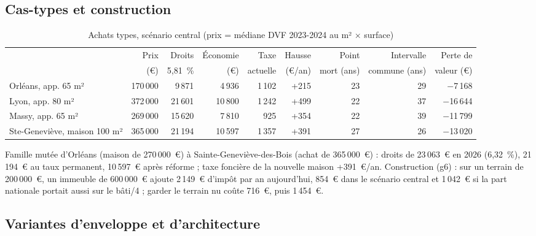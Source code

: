 \subsection{Cas-types et construction}

\begin{table}[!htbp]\centering\scriptsize
\caption{Achats types, scénario central (prix = médiane DVF 2023-2024 au m² × surface)}\label{tab:fon4_cas}
\setlength{\tabcolsep}{3.5pt}
\begin{tabular}{@{}lrrrrrrrr@{}}
\toprule
 & Prix & Droits & Économie & Taxe & Hausse & Point & Intervalle & Perte de \\
 & (€) & 5,81~\% & (€) & actuelle & (€/an) & mort (ans) & commune (ans) & valeur (€) \\
\midrule
Orléans, app. 65 m² & 170\,000 & 9\,871 & 4\,936 & 1\,102 & +215 & 23 & 29 & $-$7\,168 \\
Lyon, app. 80 m² & 372\,000 & 21\,601 & 10\,800 & 1\,242 & +499 & 22 & 37 & $-$16\,644 \\
Massy, app. 65 m² & 269\,000 & 15\,620 & 7\,810 & 925 & +354 & 22 & 39 & $-$11\,799 \\
Ste-Geneviève, maison 100 m² & 365\,000 & 21\,194 & 10\,597 & 1\,357 & +391 & 27 & 26 & $-$13\,020 \\
\bottomrule
\end{tabular}
\par\vspace{2pt}{\raggedright\scriptsize Point mort : économie de droits / hausse annuelle ; un bien revendu plus
souvent y gagne dans le cas (c). Intervalle commune : inverse de la rotation des logements du même type dans la commune.
Perte de valeur : hausse de taxe capitalisée à 3~\%, avant prise en compte des droits.\par}
\end{table}

Famille mutée d'Orléans (maison de 270\,000~€) à Sainte-Geneviève-des-Bois (achat de 365\,000~€) : droits de
23\,063~€ en 2026 (6,32~\%), 21\,194~€ au taux permanent, 10\,597~€ après
réforme ; taxe foncière de la nouvelle maison +391~€/an. Construction (g6) : sur un terrain de
200\,000~€, un immeuble de 600\,000~€ ajoute 2\,149~€ d'impôt par an aujourd'hui,
854~€ dans le scénario central et 1\,042~€ si la part nationale portait aussi
sur le bâti/4 ; garder le terrain nu coûte 716~€, puis 1\,454~€.

\subsection{Variantes d'enveloppe et d'architecture}

